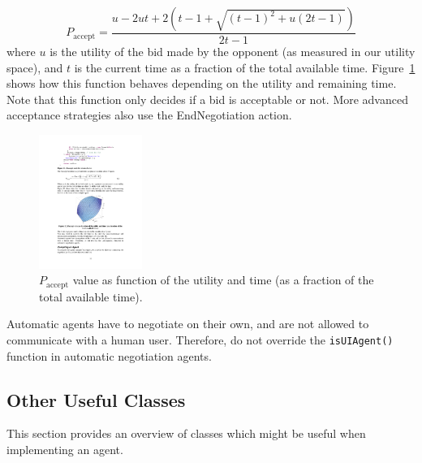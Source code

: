 \documentclass[]{article}
\begin{document}
\begin{equation}
	P_\text{accept} = \dfrac{u - 2ut + 2\left(t - 1 + \sqrt{(t - 1)^2 + u(2t - 1)}\right)}{2t - 1}
\end{equation}
where $u$ is the utility of the bid made by the opponent (as measured in our utility space), and $t$ is the current time as a fraction of the total available time. Figure~\ref{Fig:Paccept} shows how this function behaves depending on the utility and remaining time. Note that this function only decides if a bid is acceptable or not. More advanced acceptance strategies also use the EndNegotiation action.
\begin{figure}[htb]
	\centering
	\includegraphics[width=0.3\textwidth]{media/image21.pdf}
	\caption{$P_\text{accept}$ value as function of the utility and time (as a fraction of the total available time).}\label{Fig:Paccept}
\end{figure}
 
Automatic agents have to negotiate on their own, and are not allowed to communicate with a human user. Therefore, do not override the \texttt{isUIAgent()} function in automatic negotiation agents.

\subsection{Other Useful Classes}
This section provides an overview of classes which might be useful when implementing an agent.
\end{document}
